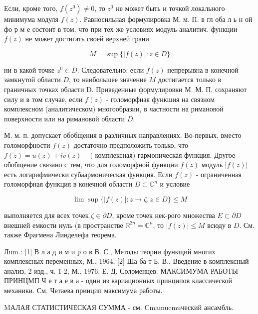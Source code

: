 \documentclass[10pt]{article}
\begin{document}
Если, кроме того, $f\left(z^{0}\right) \neq 0$, то $z^{0}$ не может быть и точкой локального минимума модуля $f(z)$. Равносильная формулировка М. м. П. в гл оба л ь н ой фо р м е состоит в том, что при тех же условиях модуль аналитич. функции $f(z)$ не может достигать своей верхней грани



\[

M=\sup \{|f(z)|: z \in D\}

\]



ни в какой точке $z^{0} \in D$. Следовательно, если $f(z)$ непрерывна в конечной замкнутой области $D$, то наибольшее значение $M$ достигается только в граничных точках области D. Приведенные формулировки М. М. П. сохраняют силу и в том случае, если $f(z)$ - голоморфная функшия на связном комплексном (аналитическом) многообразии, в частности на римановой поверхности или на римановой области $D$.



М. м. п. допускает обобщения в различных направлениях. Во-первых, вместо голоморфности $f(z)$ достаточно предположить только, что $f(z)=u(z)+i v(z)-($ комплексная) гармоническая функция. Другое обобщение связано с тем, что для голоморфной функции $f(z)$ модуль $|f(z)|$ есть логарифмически субаармоническая функция. Если $f(z)$ - ограниченная голоморфная функция в конечной области $D \subset \mathbb{C}^{n}$ и условие



\[

\lim \sup \{|f(z)|: z \rightarrow \zeta, z \in D\} \leqslant M

\]



выполняется для всех точек $\zeta \in \partial D$, кроме точек нек-рого множества $E \subset \partial D$ внешней емкости нуль (в пространстве $\mathbb{R}^{2 n}=\mathbb{C}^{n}$, то $|f(z)| \leqslant M$ всюду в $D$. См. также Фрагмена Линделефа теорема.



Лum.: [1] В л а д и м и р о в В. С., Методы теории функщий многих комплексных переменных, М., 1964; [2] Ша ба т Б. В., Введение в комплексный анализ, 2 изд., ч. 1-2, М., 1976. Е. Д. Соломенцев. МАКСИМУМА РАБОТЫ ПРИНЦМП Ч е т а е в а - один из вариационных принципов классической механики. См. Четаева принцип максимума работы.



MАЛАЯ СТАТИСТИЧЕСКАЯ СУММА - см. Cmamucmuческий ансамбль.
\end{document}
